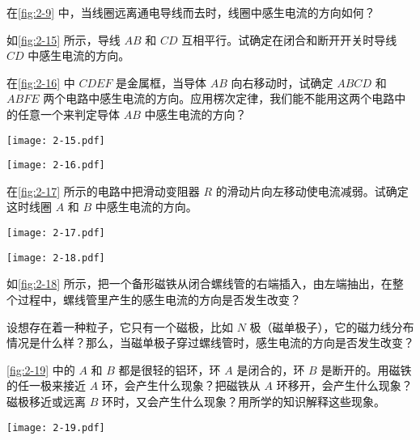 \begin{Practice}
\begin{question}
  \item 在\cref{fig:2-9} 中，当线圈远离通电导线而去时，线圈中感生电流的方向如何？
  \item 如\cref{fig:2-15} 所示，导线 $AB$ 和 $CD$ 互相平行。试确定在闭合和断开开关时导线 $CD$ 中感生电流的方向。
  \item 在\cref{fig:2-16} 中 $CDEF$ 是金属框，当导体 $AB$ 向右移动时，试确定 $ABCD$ 和 $ABFE$ 两个电路中感生电流的方向。应用楞次定律，我们能不能用这两个电路中的任意一个来判定导体 $AB$ 中感生电流的方向？
  \begin{figurehere}
  \begin{minipage}[b]{0.48\linewidth}\centering
    \texttt{[image: 2-15.pdf]}
    \caption{}\label{fig:2-15}
  \end{minipage}
  \begin{minipage}[b]{0.48\linewidth}\centering
    \texttt{[image: 2-16.pdf]}
    \caption{}\label{fig:2-16}
  \end{minipage}
  \end{figurehere}
  \item 在\cref{fig:2-17} 所示的电路中把滑动变阻器 $R$ 的滑动片向左移动使电流减弱。试确定这时线圈 $A$ 和 $B$ 中感生电流的方向。
  \begin{figurehere}
    \begin{minipage}[b]{0.5\linewidth}\centering
      \texttt{[image: 2-17.pdf]}
      \caption{}\label{fig:2-17}
    \end{minipage}%
    \begin{minipage}[b]{0.5\linewidth}\centering
      \texttt{[image: 2-18.pdf]}
      \caption{}\label{fig:2-18}
    \end{minipage}
  \end{figurehere}
  \item 如\cref{fig:2-18} 所示，把一个备形磁铁从闭合螺线管的右端插入，由左端抽出，在整个过程中，螺线管里产生的感生电流的方向是否发生改变？

  设想存在着一种粒子，它只有一个磁极，比如 $N$ 极（磁单极子），它的磁力线分布情况是什么样？那么，当磁单极子穿过螺线管时，感生电流的方向是否发生改变？
  \item \cref{fig:2-19} 中的 $A$ 和 $B$ 都是很轻的铝环，环 $A$ 是闭合的，环 $B$  是断开的。用磁铁的任一极来接近 $A$ 环，会产生什么现象？把磁铁从 $A$ 环移开，会产生什么现象？磁极移近或远离 $B$ 环时，又会产生什么现象？用所学的知识解释这些现象。
  \begin{figurehere}
    \begin{minipage}{\linewidth}\centering
    \texttt{[image: 2-19.pdf]}
    \caption{}\label{fig:2-19}
    \end{minipage}
  \end{figurehere}
\end{question}
\end{Practice}


